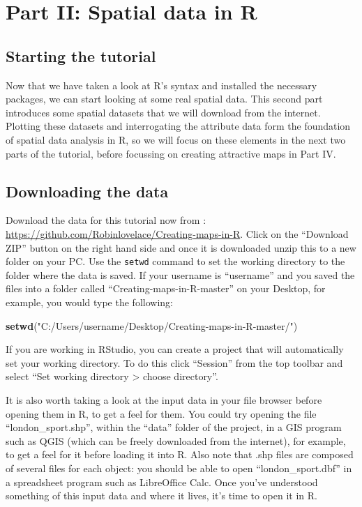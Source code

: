 \documentclass[]{article}
\newenvironment{Shaded}{}{}
\newcommand{\KeywordTok}[1]{\textcolor[rgb]{0.00,0.44,0.13}{\textbf{{#1}}}}
\newcommand{\StringTok}[1]{\textcolor[rgb]{0.25,0.44,0.63}{{#1}}}
\newcommand{\NormalTok}[1]{{#1}}
\begin{document}
\section{Part II: Spatial data in R}\label{part-ii-spatial-data-in-r}

\subsection{Starting the tutorial}\label{starting-the-tutorial}

Now that we have taken a look at R's syntax and installed the necessary
packages, we can start looking at some real spatial data. This second
part introduces some spatial datasets that we will download from the
internet. Plotting these datasets and interrogating the attribute data
form the foundation of spatial data analysis in R, so we will focus on
these elements in the next two parts of the tutorial, before focussing
on creating attractive maps in Part IV.

\subsection{Downloading the data}\label{downloading-the-data}

Download the data for this tutorial now from :
\url{https://github.com/Robinlovelace/Creating-maps-in-R}. Click on the
``Download ZIP'' button on the right hand side and once it is downloaded
unzip this to a new folder on your PC. Use the \texttt{setwd} command to
set the working directory to the folder where the data is saved. If your
username is ``username'' and you saved the files into a folder called
``Creating-maps-in-R-master'' on your Desktop, for example, you would
type the following:

\begin{Shaded}
\begin{Highlighting}[]
\KeywordTok{setwd}\NormalTok{(}\StringTok{"C:/Users/username/Desktop/Creating-maps-in-R-master/"}\NormalTok{)}
\end{Highlighting}
\end{Shaded}

If you are working in RStudio, you can create a project that will
automatically set your working directory. To do this click ``Session''
from the top toolbar and select ``Set working directory \textgreater{}
choose directory''.

It is also worth taking a look at the input data in your file browser
before opening them in R, to get a feel for them. You could try opening
the file ``london\_sport.shp'', within the ``data'' folder of the
project, in a GIS program such as QGIS (which can be freely downloaded
from the internet), for example, to get a feel for it before loading it
into R. Also note that .shp files are composed of several files for each
object: you should be able to open ``london\_sport.dbf'' in a
spreadsheet program such as LibreOffice Calc. Once you've understood
something of this input data and where it lives, it's time to open it in
R.
\end{document}
